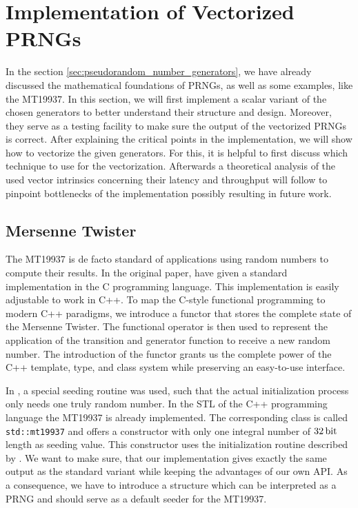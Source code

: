 \documentclass{stdlocal}
\begin{document}
\section{Implementation of Vectorized PRNGs} %
\label{sec:implementation}
  In the section \ref{sec:pseudorandom_number_generators}, we have already discussed the mathematical foundations of PRNGs, as well as some examples, like the MT19937.
  In this section, we will first implement a scalar variant of the chosen generators to better understand their structure and design.
  Moreover, they serve as a testing facility to make sure the output of the vectorized PRNGs is correct.
  After explaining the critical points in the implementation, we will show how to vectorize the given generators.
  For this, it is helpful to first discuss which technique to use for the vectorization.
  Afterwards a theoretical analysis of the used vector intrinsics concerning their latency and throughput will follow to pinpoint bottlenecks of the implementation possibly resulting in future work.

  \subsection{Mersenne Twister} %
  \label{sub:mersenne_twister}
    The MT19937 is de facto standard of applications using random numbers to compute their results.
    In the original paper, \citeauthor{matsumoto1998} have given a standard implementation in the C programming language.
    This implementation is easily adjustable to work in C++.
    To map the C-style functional programming to modern C++ paradigms, we introduce a functor that stores the complete state of the Mersenne Twister.
    The functional operator is then used to represent the application of the transition and generator function to receive a new random number.
    The introduction of the functor grants us the complete power of the C++ template, type, and class system while preserving an easy-to-use interface.

    In \textcite{kneusel2018}, a special seeding routine was used, such that the actual initialization process only needs one truly random number.
    In the STL of the C++ programming language the MT19937 is already implemented.
    The corresponding class is called \texttt{std::mt19937} and offers a constructor with only one integral number of $32\, \mathrm{bit}$ length as seeding value.
    This constructor uses the initialization routine described by \textcite{kneusel2018}.
    We want to make sure, that our implementation gives exactly the same output as the standard variant while keeping the advantages of our own API.
    As a consequence, we have to introduce a structure which can be interpreted as a PRNG and should serve as a default seeder for the MT19937.
\end{document}
